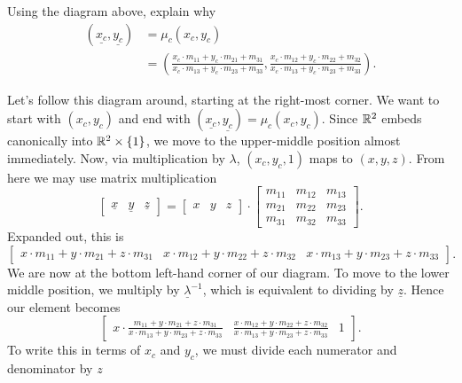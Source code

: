 \documentclass{ximera}
\begin{document}
\begin{problem}
  Using the diagram above, explain why
  \begin{align*}
(\underline{x_{c}},\underline{y_{c}})  &= \mu_{c}(x_{c},y_{c}) \\
    & =\left(
    \frac{x_c\cdot m_{11} + y_c\cdot m_{21} + m_{31}}{x_c\cdot m_{13} + y_c\cdot m_{23} + m_{33}},
    \frac{x_c\cdot m_{12} + y_c\cdot m_{22} + m_{32}}{x_c\cdot m_{13} + y_c\cdot m_{23} + m_{33}}
    \right).
  \end{align*}
  \begin{freeResponse}
    Let's follow this diagram around, starting at the right-most
    corner. We want to start with $(x_c,y_c)$ and end with
    $(\underline{x_c},\underline{y_c}) = \mu_c(x_c,y_c)$. Since $\mathbb R^2$
    embeds canonically into $\mathbb R^2\times\{1\}$, we move to the
    upper-middle position almost immediately. Now, via multiplication
    by $\lambda$, $(x_c,y_c,1)$ maps to $(x,y,z)$. From here we may use
    matrix multiplication
    \[
    \begin{bmatrix}
      \underline{x} & \underline{y} & \underline{z}
    \end{bmatrix}
    =
    \begin{bmatrix}
    x & y & z
    \end{bmatrix}
    \cdot\begin{bmatrix}
    m_{11} & m_{12} & m_{13}\\
    m_{21} & m_{22} & m_{23}\\
    m_{31} & m_{32} & m_{33}
    \end{bmatrix}.
    \]
    Expanded out, this is
    \[
    \begin{bmatrix}
      x\cdot m_{11}+y\cdot m_{21}+z\cdot m_{31} & x\cdot m_{12}+y\cdot m_{22}+z\cdot m_{32} & 
      x\cdot m_{13}+y\cdot m_{23}+z\cdot m_{33}
    \end{bmatrix}.
    \]
    We are now at the bottom left-hand corner of our diagram. To move
    to the lower middle position, we multiply by $\underline{\lambda}^{-1}$, which
    is equivalent to dividing by $\underline{z}$. Hence our element
    becomes
     \[
    \begin{bmatrix}
      x\cdot \frac{m_{11}+y\cdot m_{21}+z\cdot m_{31}}{x\cdot m_{13}+y\cdot m_{23}+z\cdot m_{33}} &
      \frac{x\cdot m_{12}+y\cdot m_{22}+z\cdot m_{32}}{x\cdot m_{13}+y\cdot m_{23}+z\cdot m_{33}} & 1
    \end{bmatrix}.
    \]
    To write this in terms of $x_c$ and $y_c$, we must divide each
    numerator and denominator by $z$

\end{freeResponse}
\end{problem}
\end{document}
